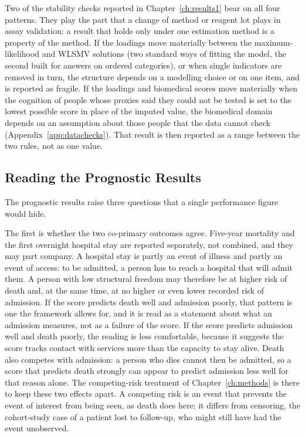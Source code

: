 Two of the stability checks reported in Chapter~\ref{ch:results1} bear on all four
patterns. They play the part that a change of method or reagent lot plays in assay
validation: a result that holds only under one estimation method is a property of
the method. If the loadings move materially between the maximum-likelihood and WLSMV
solutions (two standard ways of fitting the model, the second built for answers on
ordered categories), or when single indicators are removed in turn, the structure depends on
a modelling choice or on one item, and is reported as fragile. If the loadings and
biomedical scores move materially when the cognition of people whose proxies said
they could not be tested is set to the lowest possible score in place of the imputed
value, the biomedical domain depends on an assumption about those people that the
data cannot check (Appendix~\ref{app:datachecks}). That result is then reported as
a range between the two rules, not as one value.

\subsection{Reading the Prognostic Results}
\label{sec:disc-read-prog}

The prognostic results raise three questions that a single performance figure
would hide.

The first is whether the two co-primary outcomes agree. Five-year mortality and the
first overnight hospital stay are reported separately, not combined, and they may
part company. A hospital stay is partly an event of illness and partly an event of
access: to be admitted, a person has to reach a hospital that will admit them. A
person with low structural freedom may therefore be at higher risk of death and, at
the same time, at no higher or even lower recorded risk of admission. If the score
predicts death well and admission poorly, that pattern is one the framework allows
for, and it is read as a statement about what an admission measures, not as a
failure of the score. If the score predicts admission well and death poorly, the
reading is less comfortable, because it suggests the score tracks contact with
services more than the capacity to stay alive. Death also competes with admission:
a person who dies cannot then be admitted, so a score that predicts death strongly
can appear to predict admission less well for that reason alone. The competing-risk
treatment of Chapter~\ref{ch:methods} is there to keep these two effects apart. A
competing risk is an event that prevents the event of interest from being seen,
as death does here; it differs from censoring, the cohort-study case of a patient
lost to follow-up, who might still have had the event unobserved.

